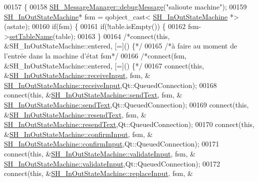 \begin{DoxyCode}
00157                                                                                       \{
00158     \hyperlink{classSH__MessageManager_a379f2aa0a590a5add34dbe91f98b2ff7}{SH\_MessageManager::debugMessage}(\textcolor{stringliteral}{"salioute machine"});
00159     \hyperlink{classSH__InOutStateMachine}{SH\_InOutStateMachine}* fsm = qobject\_cast<
      \hyperlink{classSH__InOutStateMachine}{SH\_InOutStateMachine} *>(astate);
00160     \textcolor{keywordflow}{if}(fsm) \{
00161         \textcolor{keywordflow}{if}(!table.isEmpty()) \{
00162             fsm->\hyperlink{classSH__InOutStateMachine_a95db31a7e7f31f36a8737adc739ab08c}{setTableName}(table);
00163         \}
00164         \textcolor{comment}{/*connect(this, &SH\_InOutStateMachine::entered, [=]() \{*/}
00165         \textcolor{comment}{/*à faire au moment de l'entrée dans la machine d'état fsm*/}
00166         \textcolor{comment}{/*connect(fsm, &SH\_InOutStateMachine::entered, [=]() \{*/}
00167         connect(\textcolor{keyword}{this}, &\hyperlink{classSH__InOutStateMachine_a037ed5e13ecfae2123a8d4940292e410}{SH\_InOutStateMachine::receiveInput}, fsm, &
      \hyperlink{classSH__InOutStateMachine_a037ed5e13ecfae2123a8d4940292e410}{SH\_InOutStateMachine::receiveInput},Qt::QueuedConnection);
00168         connect(\textcolor{keyword}{this}, &\hyperlink{classSH__InOutStateMachine_a5e7f5958bae31696b6a8deab94ad2b4f}{SH\_InOutStateMachine::sendText}, fsm, &
      \hyperlink{classSH__InOutStateMachine_a5e7f5958bae31696b6a8deab94ad2b4f}{SH\_InOutStateMachine::sendText},Qt::QueuedConnection);
00169         connect(\textcolor{keyword}{this}, &\hyperlink{classSH__InOutStateMachine_a526822c66b46aa0cd81ba4473fa5573f}{SH\_InOutStateMachine::resendText}, fsm, &
      \hyperlink{classSH__InOutStateMachine_a526822c66b46aa0cd81ba4473fa5573f}{SH\_InOutStateMachine::resendText},Qt::QueuedConnection);
00170         connect(\textcolor{keyword}{this}, &\hyperlink{classSH__InOutStateMachine_a7f7d9c9300c1d05bce2c26029f28cc31}{SH\_InOutStateMachine::confirmInput}, fsm, &
      \hyperlink{classSH__InOutStateMachine_a7f7d9c9300c1d05bce2c26029f28cc31}{SH\_InOutStateMachine::confirmInput},Qt::QueuedConnection);
00171         connect(\textcolor{keyword}{this}, &\hyperlink{classSH__InOutStateMachine_aec1b3fef3c1f82499aa1f73beaecd08a}{SH\_InOutStateMachine::validateInput}, fsm, &
      \hyperlink{classSH__InOutStateMachine_aec1b3fef3c1f82499aa1f73beaecd08a}{SH\_InOutStateMachine::validateInput},Qt::QueuedConnection);
00172         connect(\textcolor{keyword}{this}, &\hyperlink{classSH__InOutStateMachine_a9fa5db44086de2576c812f631aa4f60a}{SH\_InOutStateMachine::replaceInput}, fsm, &

\end{DoxyCode}
